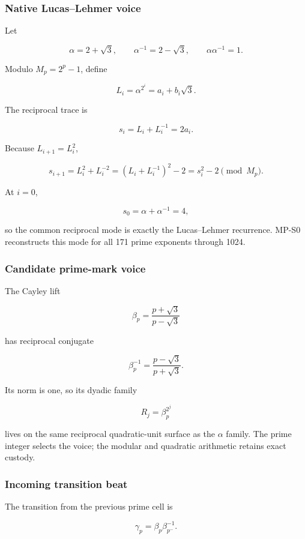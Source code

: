 \subsubsection{Native Lucas--Lehmer
voice}\label{viii-ch10-native-lucaslehmer-voice}

Let

\[
\alpha=2+\sqrt3,
\qquad
\alpha^{-1}=2-\sqrt3,
\qquad
\alpha\alpha^{-1}=1.
\]

Modulo \(M_p=2^p-1\), define

\[
L_i=\alpha^{2^i}=a_i+b_i\sqrt3.
\]

The reciprocal trace is

\[
s_i=L_i+L_i^{-1}=2a_i.
\]

Because \(L_{i+1}=L_i^2\),

\[
s_{i+1}
=L_i^2+L_i^{-2}
=(L_i+L_i^{-1})^2-2
=s_i^2-2\pmod{M_p}.
\]

At \(i=0\),

\[
s_0=\alpha+\alpha^{-1}=4,
\]

so the common reciprocal mode is exactly the Lucas--Lehmer recurrence.
MP-S0 reconstructs this mode for all 171 prime exponents through 1024.

\subsubsection{Candidate prime-mark
voice}\label{viii-ch10-candidate-prime-mark-voice}

The Cayley lift

\[
\beta_p=\frac{p+\sqrt3}{p-\sqrt3}
\]

has reciprocal conjugate

\[
\beta_p^{-1}=\frac{p-\sqrt3}{p+\sqrt3}.
\]

Its norm is one, so its dyadic family

\[
R_j=\beta_p^{2^j}
\]

lives on the same reciprocal quadratic-unit surface as the \(\alpha\)
family. The prime integer selects the voice; the modular and quadratic
arithmetic retains exact custody.

\subsubsection{Incoming transition beat}\label{viii-ch10-incoming-transition-beat}

The transition from the previous prime cell is

\[
\gamma_p=\beta_p\beta_{p^-}^{-1}.
\]

